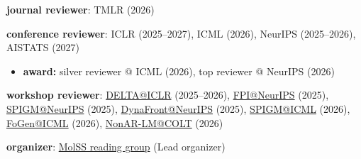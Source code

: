     \begin{highlights}
        \item \textbf{journal reviewer}: TMLR (2026)
        \item \textbf{conference reviewer}: ICLR (2025--2027), ICML (2026), NeurIPS (2025--2026), AISTATS (2027)
        \begin{itemize}[
            topsep=0.05 cm,
            parsep=0.05 cm,
            partopsep=0pt,
            itemsep=0pt,
            leftmargin=0.6 cm
        ]
            \item \textbf{award:} silver reviewer @ ICML (2026), top reviewer @ NeurIPS (2026)
        \end{itemize}
        \item \textbf{workshop reviewer}: \href{https://delta-workshop.github.io/DeLTa2026/}{DELTA@ICLR} (2025--2026), \href{https://fpineurips.framer.website/}{FPI@NeurIPS} (2025), \href{https://spigmworkshopv3.github.io/}{SPIGM@NeurIPS} (2025), \href{https://sites.google.com/view/dynafrontneurips25}{DynaFront@NeurIPS} (2025), \href{https://spigmworkshop2026.github.io/}{SPIGM@ICML} (2026), \href{https://fdgm-workshop.github.io/FDGM_ICML2026/}{FoGen@ICML} (2026), \href{https://pengzhangzhi.github.io/NonAR-LM/\#top}{NonAR-LM@COLT} (2026)
        \item \textbf{organizer}: \href{https://molss-reading-group.github.io/MolSS/}{MolSS reading group} (Lead organizer)
    \end{highlights}
